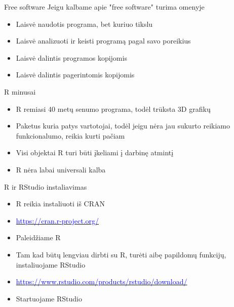 \documentclass[11pt,xcolor=table]{beamer}
\begin{document}

\begin{frame}{Free software}
Jeigu kalbame apie "free software" turima omenyje
\begin{itemize}
\item Laisvė naudotis programa, bet kuriuo tikslu
\item Laisvė analizuoti ir keisti programą pagal savo poreikius
\item Laisvė dalintis programos kopijomis
\item Laisvė dalintis pagerintomis kopijomis
\end{itemize}
\end{frame}


\begin{frame}{R minusai}
\begin{itemize}
\item R remiasi 40 metų senumo programa, todėl trūksta 3D grafikų 
\item Paketus kuria patys vartotojai, todėl jeigu nėra jau sukurto reikiamo funkcionalumo, reikia kurti pačiam
\item Visi objektai R turi būti įkeliami į darbinę atmintį
\item R nėra labai universali kalba
\end{itemize}
\end{frame}


\begin{frame}{R ir RStudio instaliavimas}
\begin{itemize}
\item R reikia instaliuoti iš CRAN
\item \href{https://cran.r-project.org/}{\textcolor{blue}{https://cran.r-project.org/}}
\item Paleidžiame R 
\item Tam kad būtų lengviau dirbti su R, turėti aibę papildomų funkcijų, instaliuojame RStudio
\item \href{https://www.rstudio.com/products/rstudio/download/}{\textcolor{blue}{https://www.rstudio.com/products/rstudio/download/}}
\item Startuojame RStudio
\end{itemize}
\end{frame}
\end{document}
